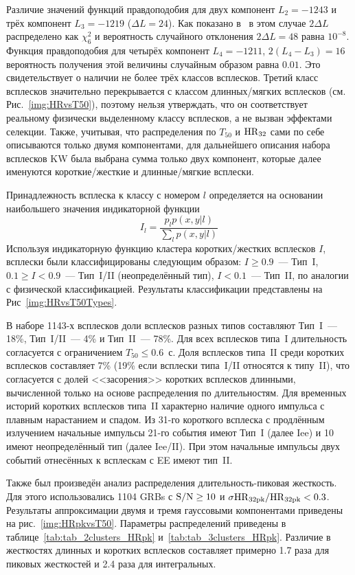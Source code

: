 Различие значений функций правдоподобия для двух компонент $L_2 = -1243$ и трёх 
компонент $L_3 = -1219$ ($\Delta L = 24$). Как показано в~\citep{Horvath_2006} 
в этом случае $2\Delta L$ распределено как $\chi^2_6$ и вероятность случайного 
отклонения $2\Delta L = 48$ равна $10^{-8}$. Функция правдоподобия для четырёх 
компонент $L_4 = -1211$, $2(L_4 - L_3) = 16$ вероятность получения этой величины случайным образом равна $0.01$. 
Это свидетельствует о наличии не более трёх классов всплесков. Третий класс всплесков 
значительно перекрывается с классом длинных/мягких всплесков (см. Рис.~\ref{img:HRvsT50}), поэтому нельзя утверждать, 
что он соответствует реальному физически выделенному классу всплесков, а не вызван эффектами селекции. 
Также, учитывая, что распределения по $T_{50}$ и ${\mathrm{HR}}_{32}$ сами по себе описываются 
только двумя компонентами, для дальнейшего описания набора всплесков KW была выбрана
сумма только двух компонент, которые далее именуются короткие/жесткие и длинные/мягкие всплески.

Принадлежность всплеска к классу с номером $l$ определяется на основании наибольшего 
значения индикаторной функции
\begin{equation}
I_l =\frac{p_l p(x,y|l)}{\sum_l  p(x, y|l)}
\end{equation}
Используя индикаторную функцию кластера коротких/жестких всплесков $I$, 
всплески были классифицированы следующим образом: 
$I \geq 0.9$~--- Тип~I, $0.1 \geq I < 0.9$~--- Тип~I/II (неопределённый тип), 
$I < 0.1$~--- Тип~II, по аналогии с физической классификацией. 
Результаты классификации представлены на Рис~\ref{img:HRvsT50Types}.

В наборе 1143-х всплесков доли всплесков разных типов составляют Тип~I~--- 18\%,
Тип~I/II~--- 4\% и Тип~II~--- 78\%. Для всех всплесков типа~I длительность согласуется 
с ограничением $T_{50} \leq 0.6$~с. Доля всплесков типа~II среди коротких всплесков 
составляет 7\% (19\% если всплески типа~I/II относятся к типу~II), что согласуется с долей
<<засорения>> коротких всплесков длинными, вычисленной только на основе распределения 
по длительностям. Для временных историй коротких всплесков типа~II характерно 
наличие одного импульса с плавным нарастанием и спадом.
Из 31-го короткого всплеска с продлённым излучением начальные импульсы 21-го события 
имеют Тип~I (далее Iee) и 10 имеют неопределённый тип (далее Iee/II).
При этом начальные импульсы двух событий отнесённых к всплескам с EE имеют тип~II.   %

Также был произведён анализ распределения длительность-пиковая жесткость. 
Для этого использовались 1104 GRBs с ${\mathrm{S/N}} \geq 10$ и $\sigma {\mathrm{HR}}_{32{\mathrm{pk}}}/{\mathrm{HR}}_{32{\mathrm{pk}}} <0.3$. 
Результаты аппроксимации двумя и тремя гауссовыми компонентами приведены на рис.~\ref{img:HRpkvsT50}. 
Параметры распределений приведены в таблице~\ref{tab:tab_2clusters_HRpk} и~\ref{tab:tab_3clusters_HRpk}. 
Различие в жесткостях длинных и коротких всплесков составляет примерно 1.7 раза для пиковых 
жесткостей и 2.4 раза для интегральных. 

